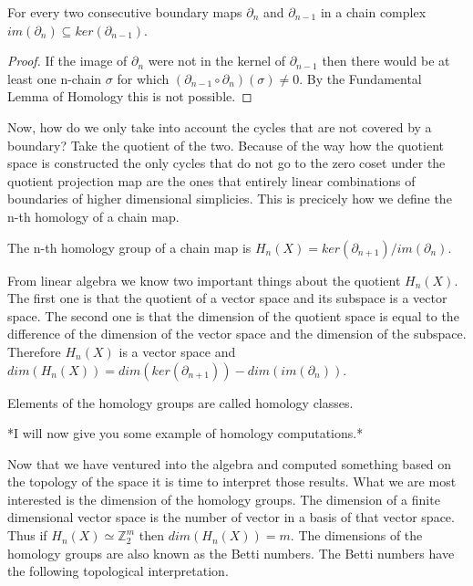 \begin{cor}  For every two consecutive boundary maps $\partial_n$ and $\partial_{n-1}$ in a chain complex $im(\partial_n) \subseteq ker(\partial_{n-1})$. \end{cor}

\begin{proof}
    If the image of $\partial_n$ were not in the kernel of $\partial_{n-1}$ then there would be at least one n-chain $\sigma$ for which $(\partial_{n-1} \circ \partial_n) (\sigma) \ne 0$. By the Fundamental Lemma of Homology this is not possible.
\end{proof}

Now, how do we only take into account the cycles that are not covered by a boundary? Take the quotient of the two. Because of the way how the quotient space is constructed the only cycles that do not go to the zero coset under the quotient projection map are the ones that entirely linear combinations of boundaries of higher dimensional simplicies. This is precicely how we define the n-th homology of a chain map.


\begin{defn} The n-th homology group of a chain map is $H_n(X) = ker(\partial_{n+1})\big/im(\partial_n)$. \end{defn}

    From linear algebra \cite{lin-alg-done-right} we know two important things about the quotient $H_n(X)$. The first one is that the quotient of a vector space and its subspace is a vector space. The second one is that the dimension of the quotient space is equal to the difference of the dimension of the vector space and the dimension of the subspace. Therefore $H_n(X)$ is a vector space and $dim(H_n(X)) = dim(ker(\partial_{n+1})) - dim(im(\partial_n))$.

Elements of the homology groups are called homology classes.

*I will now give you some example of homology computations.*


Now that we have ventured into the algebra and computed something based on the topology of the space it is time to interpret those results. 
What we are most interested is the dimension of the homology groups. The dimension of a finite dimensional vector space is the number of vector in a basis of that vector space. Thus if $H_n(X) \simeq \mathbb{Z}_2^m$ then $dim(H_n(X)) = m$. The dimensions of the homology groups are also known as the Betti numbers. The Betti numbers have the following topological interpretation.


